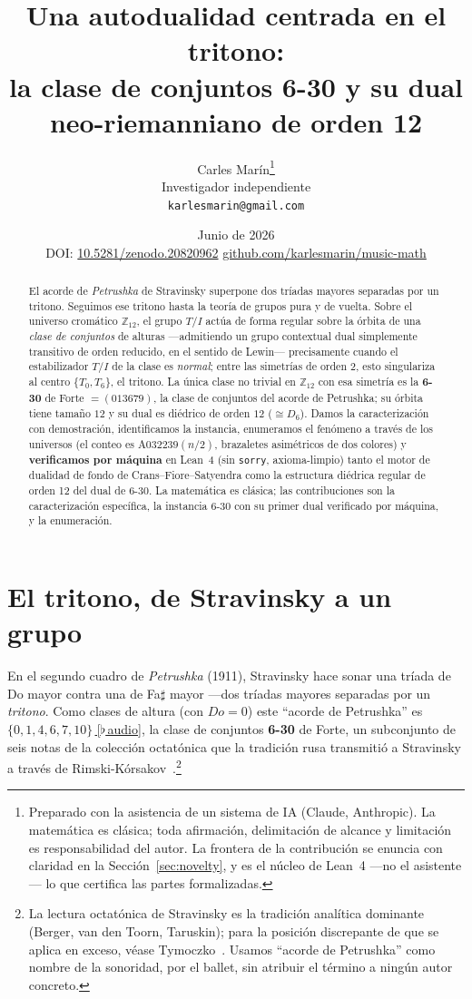 \documentclass[11pt]{article}
\title{\bf Una autodualidad centrada en el tritono:\\
  la clase de conjuntos 6-30 y su dual neo-riemanniano de orden 12}
\author{Carles Mar\'in\thanks{Preparado con la asistencia de un sistema de IA (Claude, Anthropic).
La matemática es clásica; toda afirmación, delimitación de alcance y limitación es responsabilidad del
autor. La frontera de la contribución se enuncia con claridad en la Sección~\ref{sec:novelty}, y es el
núcleo de Lean~4 ---no el asistente--- lo que certifica las partes formalizadas.}\\[3pt]
  \normalsize Investigador independiente\\
  \normalsize \texttt{karlesmarin@gmail.com}}
\date{Junio de 2026\\[3pt]\normalsize DOI: \href{https://doi.org/10.5281/zenodo.20820962}{10.5281/zenodo.20820962}
\quad\textbullet\quad \href{https://github.com/karlesmarin/music-math}{github.com/karlesmarin/music-math}}
\newcommand{\lean}[1]{\texttt{#1}}
\newcommand{\Ztwelve}{\mathbb{Z}_{12}}
\newcommand{\Dgrp}[1]{D_{#1}}
\newcommand{\audiobase}{https://github.com/karlesmarin/music-math/raw/main/media}
\newcommand{\audio}[1]{\href{\audiobase/#1}{\textcolor{ctA}{\footnotesize\,[$\flat$\,audio]}}}
\begin{document}
\maketitle

\begin{abstract}\noindent
El acorde de \emph{Petrushka} de Stravinsky superpone dos tríadas mayores separadas por un tritono.
Seguimos ese tritono hasta la teoría de grupos pura y de vuelta. Sobre el universo cromático
$\Ztwelve$, el grupo $T/I$ actúa de forma regular sobre la órbita de una \emph{clase de conjuntos} de
alturas ---admitiendo un grupo contextual dual simplemente transitivo de orden reducido, en el sentido
de Lewin--- precisamente cuando el estabilizador $T/I$ de la clase es \emph{normal}; entre las simetrías
de orden 2, esto singulariza al centro $\{T_0,T_6\}$, el tritono. La única clase no trivial en
$\Ztwelve$ con esa simetría es la \textbf{6-30} de Forte $=(013679)$, la clase de conjuntos del acorde
de Petrushka; su órbita tiene tamaño $12$ y su dual es diédrico de orden $12$ ($\cong\Dgrp{6}$). Damos la
caracterización con demostración, identificamos la instancia, enumeramos el fenómeno a través de los
universos (el conteo es $\mathrm{A}032239(n/2)$, brazaletes asimétricos de dos colores) y
\textbf{verificamos por máquina} en Lean~4 (sin \lean{sorry}, axioma-limpio) tanto el motor de dualidad
de fondo de Crans--Fiore--Satyendra como la estructura diédrica regular de orden 12 del dual de 6-30. La
matemática es clásica; las contribuciones son la caracterización específica, la instancia 6-30 con su
primer dual verificado por máquina, y la enumeración.
\end{abstract}

\section{El tritono, de Stravinsky a un grupo}\label{sec:intro}

En el segundo cuadro de \emph{Petrushka} (1911), Stravinsky hace sonar una tríada de Do mayor contra una
de Fa$\sharp$ mayor ---dos tríadas mayores separadas por un \emph{tritono}. Como clases de altura (con
$Do=0$) este ``acorde de Petrushka'' es $\{0,1,4,6,7,10\}$\,\audio{petrushka_chord.wav}, la clase de conjuntos
\textbf{6-30} de Forte,
un subconjunto de seis notas de la colección octatónica que la tradición rusa transmitió a Stravinsky a
través de Rimski-Kórsakov~\cite{Berger,Taruskin,vandenToorn}.\footnote{La lectura octatónica de
Stravinsky es la tradición analítica dominante (Berger, van den Toorn, Taruskin); para la posición
discrepante de que se aplica en exceso, véase Tymoczko~\cite{TymoczkoOct}. Usamos ``acorde de Petrushka''
como nombre de la sonoridad, por el ballet, sin atribuir el término a ningún autor concreto.}
\end{document}
